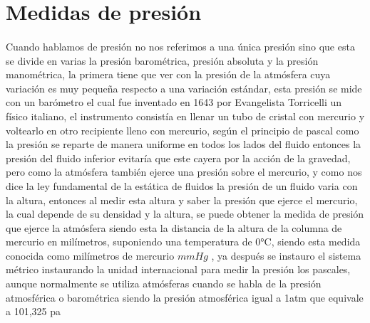\documentclass{article}
\begin{document}
\section*{Medidas de presión}
\paragraph*{}
Cuando hablamos de presión no nos referimos a una única presión sino que esta se divide en varias
la presión barométrica, presión absoluta y la presión manométrica, la primera tiene que ver con la presión
de la atmósfera cuya variación es muy pequeña respecto a una variación estándar, esta presión se mide con un 
barómetro el cual fue inventado en 1643 por Evangelista Torricelli un físico italiano, el instrumento consistía 
en llenar un tubo de cristal con mercurio y voltearlo en otro recipiente lleno con mercurio, según el principio de 
pascal como la presión se reparte de manera uniforme en todos los lados del fluido entonces la presión del fluido
inferior evitaría que este cayera por la acción de la gravedad, pero como la atmósfera también ejerce una presión
sobre el mercurio, y como nos dice la ley fundamental de la estática de fluidos la presión de un fluido
varia con la altura, entonces al medir esta altura y saber la presión que ejerce el mercurio, la cual depende
de su densidad y la altura, se puede obtener la medida de presión que ejerce la atmósfera siendo esta
la distancia de la altura de la columna de mercurio en milímetros, suponiendo una temperatura de 0°C,
siendo esta medida conocida como milímetros de mercurio $mmHg$ , ya después se instauro el sistema métrico 
instaurando la unidad internacional 
para medir la presión los pascales, aunque normalmente se utiliza atmósferas cuando se habla de la
presión atmosférica o barométrica siendo la presión atmosférica igual a 1atm que equivale a 101,325 pa
\end{document}
